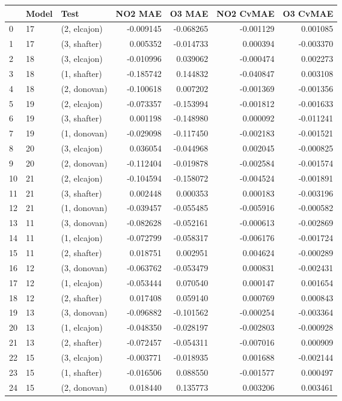 \begin{tabular}{lllrrrr}
\toprule
{} & Model &          Test &   NO2 MAE &    O3 MAE &  NO2 CvMAE &  O3 CvMAE \\
\midrule
0  &    17 &  (2, elcajon) & -0.009145 & -0.068265 &  -0.001129 &  0.001085 \\
1  &    17 &  (3, shafter) &  0.005352 & -0.014733 &   0.000394 & -0.003370 \\
2  &    18 &  (3, elcajon) & -0.010996 &  0.039062 &  -0.000474 &  0.002273 \\
3  &    18 &  (1, shafter) & -0.185742 &  0.144832 &  -0.040847 &  0.003108 \\
4  &    18 &  (2, donovan) & -0.100618 &  0.007202 &  -0.001369 & -0.001356 \\
5  &    19 &  (2, elcajon) & -0.073357 & -0.153994 &  -0.001812 & -0.001633 \\
6  &    19 &  (3, shafter) &  0.001198 & -0.148980 &   0.000092 & -0.011241 \\
7  &    19 &  (1, donovan) & -0.029098 & -0.117450 &  -0.002183 & -0.001521 \\
8  &    20 &  (3, elcajon) &  0.036054 & -0.044968 &   0.002045 & -0.000825 \\
9  &    20 &  (2, donovan) & -0.112404 & -0.019878 &  -0.002584 & -0.001574 \\
10 &    21 &  (2, elcajon) & -0.104594 & -0.158072 &  -0.004524 & -0.001891 \\
11 &    21 &  (3, shafter) &  0.002448 &  0.000353 &   0.000183 & -0.003196 \\
12 &    21 &  (1, donovan) & -0.039457 & -0.055485 &  -0.005916 & -0.000582 \\
13 &    11 &  (3, donovan) & -0.082628 & -0.052161 &  -0.000613 & -0.002869 \\
14 &    11 &  (1, elcajon) & -0.072799 & -0.058317 &  -0.006176 & -0.001724 \\
15 &    11 &  (2, shafter) &  0.018751 &  0.002951 &   0.004624 & -0.000289 \\
16 &    12 &  (3, donovan) & -0.063762 & -0.053479 &   0.000831 & -0.002431 \\
17 &    12 &  (1, elcajon) & -0.053444 &  0.070540 &   0.000147 &  0.001654 \\
18 &    12 &  (2, shafter) &  0.017408 &  0.059140 &   0.000769 &  0.000843 \\
19 &    13 &  (3, donovan) & -0.096882 & -0.101562 &  -0.000254 & -0.003364 \\
20 &    13 &  (1, elcajon) & -0.048350 & -0.028197 &  -0.002803 & -0.000928 \\
21 &    13 &  (2, shafter) & -0.072457 & -0.054311 &  -0.007016 &  0.000909 \\
22 &    15 &  (3, elcajon) & -0.003771 & -0.018935 &   0.001688 & -0.002144 \\
23 &    15 &  (1, shafter) & -0.016506 &  0.088550 &  -0.001577 &  0.000497 \\
24 &    15 &  (2, donovan) &  0.018440 &  0.135773 &   0.003206 &  0.003461 \\
\bottomrule
\end{tabular}
